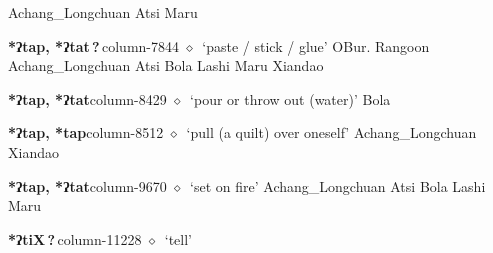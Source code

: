          Achang\_Longchuan 
\hspace{1ex}
         Atsi 
\hspace{1ex}
         Maru 
  \item {\footnotesize \textbf{*ʔtap, *ʔtat\,?\,}}{\tiny column-7844}
         $\diamond$~`paste / stick / glue'
         OBur. 
\hspace{1ex}
         Rangoon 
\hspace{1ex}
         Achang\_Longchuan 
\hspace{1ex}
         Atsi 
\hspace{1ex}
         Bola 
\hspace{1ex}
         Lashi 
\hspace{1ex}
         Maru 
\hspace{1ex}
         Xiandao 
  \item {\footnotesize \textbf{*ʔtap, *ʔtat}}{\tiny column-8429}
         $\diamond$~`pour or throw out (water)'
         Bola 
  \item {\footnotesize \textbf{*ʔtap, *tap}}{\tiny column-8512}
         $\diamond$~`pull (a quilt) over oneself'
         Achang\_Longchuan 
\hspace{1ex}
         Xiandao 
  \item {\footnotesize \textbf{*ʔtap, *ʔtat}}{\tiny column-9670}
         $\diamond$~`set on fire'
         Achang\_Longchuan 
\hspace{1ex}
         Atsi 
\hspace{1ex}
         Bola 
\hspace{1ex}
         Lashi 
\hspace{1ex}
         Maru 
  \item {\footnotesize \textbf{*ʔtiX\,?\,}}{\tiny column-11228}
         $\diamond$~`tell'

